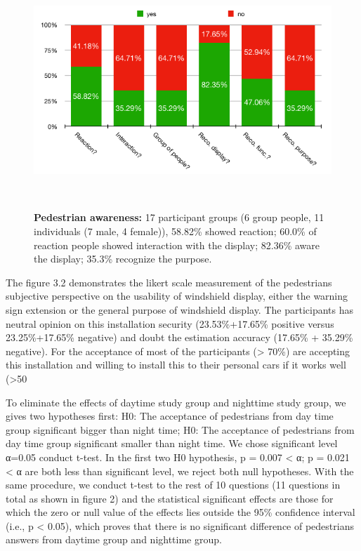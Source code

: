 \begin{figure}
\centering
\includegraphics[width=0.9\columnwidth]{figures/yesno}
\caption{\textbf{Pedestrian awareness:} 17 participant groups (6 group people, 11 individuals (7 male, 4 female)), 
58.82\% showed reaction; 60.0\% of reaction people showed interaction with the display; 
82.36\% aware the display; 35.3\% recognize the purpose. }~\label{fig:figure1}
\end{figure}

The figure 3.2 demonstrates the likert scale measurement of the pedestrians subjective perspective on the usability of windshield display, either the warning sign extension or the general purpose of windshield display.  The participants has neutral opinion on this installation security (23.53\%+17.65\% positive versus 23.25\%+17.65\% negative) and doubt the estimation accuracy (17.65\% + 35.29\% negative). For the acceptance of most of the participants (> 70\%) are accepting this installation and willing to install this to their personal cars if it works well (>50%

To eliminate the effects of daytime study group and nighttime study group, we gives two hypotheses first:  H0: The acceptance of pedestrians from day time group significant bigger than night time; H0: The acceptance of pedestrians from day time group significant smaller than night time. We chose significant level α=0.05 conduct t-test. In the first two H0 hypothesis, p = 0.007 < α; p = 0.021 < α are both less than significant level, we reject both null hypotheses.  With the same procedure, we conduct t-test to the rest of 10 questions (11 questions in total as shown in figure 2) and the statistical significant effects are those for which the zero or null value of the effects lies outside the 95\% confidence interval (i.e., p < 0.05), which proves that there is no significant difference of pedestrians answers from daytime group and nighttime group.

